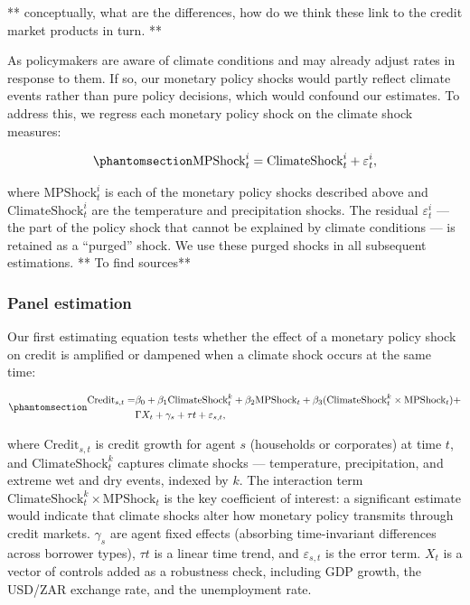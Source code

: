 \documentclass[
  letterpaper,
  DIV=11,
  numbers=noendperiod]{scrartcl}
\begin{document}
** conceptually, what are the differences, how do we think these link to
the credit market products in turn. **

As policymakers are aware of climate conditions and may already adjust
rates in response to them. If so, our monetary policy shocks would
partly reflect climate events rather than pure policy decisions, which
would confound our estimates. To address this, we regress each monetary
policy shock on the climate shock measures:

\begin{equation}\phantomsection\label{eq-purge}{
\text{MPShock}^i_{t} = \text{ClimateShock}^i_t + \varepsilon^i_t,
}\end{equation}

where \(\text{MPShock}^i_{t}\) is each of the monetary policy shocks
described above and \(\text{ClimateShock}^i_t\) are the temperature and
precipitation shocks. The residual \(\varepsilon^i_t\) --- the part of
the policy shock that cannot be explained by climate conditions --- is
retained as a ``purged'' shock. We use these purged shocks in all
subsequent estimations. ** To find sources**

\subsubsection{Panel estimation}\label{panel-estimation}

Our first estimating equation tests whether the effect of a monetary
policy shock on credit is amplified or dampened when a climate shock
occurs at the same time:

\begin{equation}\phantomsection\label{eq-credit}{
\begin{aligned}
\text{Credit}_{s,t} = &\beta_0 + \beta_1 \text{ClimateShock}_{t}^k  + \beta_2 \text{MPShock}_t + 
                       \beta_3 (\text{ClimateShock}_t^k \times \text{MPShock}_t) + \\
                       &\Gamma X_t + \gamma_s + \tau t + \varepsilon_{s,t}, 
\end{aligned}
}\end{equation}

where \(\text{Credit}_{s,t}\) is credit growth for agent \(s\)
(households or corporates) at time \(t\), and
\(\text{ClimateShock}_{t}^k\) captures climate shocks --- temperature,
precipitation, and extreme wet and dry events, indexed by \(k\). The
interaction term \(\text{ClimateShock}_{t}^k\times\text{MPShock}_t\) is
the key coefficient of interest: a significant estimate would indicate
that climate shocks alter how monetary policy transmits through credit
markets. \(\gamma_s\) are agent fixed effects (absorbing time-invariant
differences across borrower types), \(\tau t\) is a linear time trend,
and \(\varepsilon_{s,t}\) is the error term. \(X_t\) is a vector of
controls added as a robustness check, including GDP growth, the USD/ZAR
exchange rate, and the unemployment rate.
\end{document}
